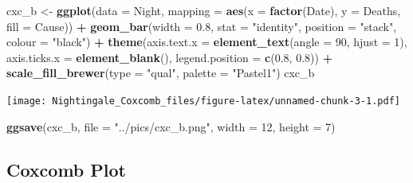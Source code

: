 \documentclass[
]{article}
\newenvironment{Shaded}{\begin{snugshade}}{\end{snugshade}}
\newcommand{\DataTypeTok}[1]{\textcolor[rgb]{0.13,0.29,0.53}{#1}}
\newcommand{\DecValTok}[1]{\textcolor[rgb]{0.00,0.00,0.81}{#1}}
\newcommand{\FloatTok}[1]{\textcolor[rgb]{0.00,0.00,0.81}{#1}}
\newcommand{\KeywordTok}[1]{\textcolor[rgb]{0.13,0.29,0.53}{\textbf{#1}}}
\newcommand{\NormalTok}[1]{#1}
\newcommand{\OperatorTok}[1]{\textcolor[rgb]{0.81,0.36,0.00}{\textbf{#1}}}
\newcommand{\StringTok}[1]{\textcolor[rgb]{0.31,0.60,0.02}{#1}}
\begin{document}
\begin{Shaded}
\begin{Highlighting}[]
\NormalTok{cxc_b <-}\StringTok{ }
\StringTok{  }\KeywordTok{ggplot}\NormalTok{(}\DataTypeTok{data =}\NormalTok{ Night,}
         \DataTypeTok{mapping =} \KeywordTok{aes}\NormalTok{(}\DataTypeTok{x =} \KeywordTok{factor}\NormalTok{(Date), }
                       \DataTypeTok{y =}\NormalTok{ Deaths, }
                       \DataTypeTok{fill =}\NormalTok{ Cause)) }\OperatorTok{+}
\StringTok{  }\KeywordTok{geom_bar}\NormalTok{(}\DataTypeTok{width =} \FloatTok{0.8}\NormalTok{, }
           \DataTypeTok{stat =} \StringTok{"identity"}\NormalTok{, }
           \DataTypeTok{position =} \StringTok{"stack"}\NormalTok{, }
           \DataTypeTok{colour =} \StringTok{"black"}\NormalTok{) }\OperatorTok{+}
\StringTok{  }\KeywordTok{theme}\NormalTok{(}\DataTypeTok{axis.text.x =} \KeywordTok{element_text}\NormalTok{(}\DataTypeTok{angle =} \DecValTok{90}\NormalTok{, }\DataTypeTok{hjust =} \DecValTok{1}\NormalTok{),}
        \DataTypeTok{axis.ticks.x =} \KeywordTok{element_blank}\NormalTok{(),}
        \DataTypeTok{legend.position =} \KeywordTok{c}\NormalTok{(}\FloatTok{0.8}\NormalTok{, }\FloatTok{0.8}\NormalTok{)) }\OperatorTok{+}
\StringTok{  }\KeywordTok{scale_fill_brewer}\NormalTok{(}\DataTypeTok{type =} \StringTok{"qual"}\NormalTok{, }
                    \DataTypeTok{palette =} \StringTok{"Pastel1"}\NormalTok{)}
\NormalTok{cxc_b}
\end{Highlighting}
\end{Shaded}

\texttt{[image: Nightingale\_Coxcomb\_files/figure-latex/unnamed-chunk-3-1.pdf]}

\begin{Shaded}
\begin{Highlighting}[]
\KeywordTok{ggsave}\NormalTok{(cxc_b, }\DataTypeTok{file =} \StringTok{"../pics/cxc_b.png"}\NormalTok{, }\DataTypeTok{width =} \DecValTok{12}\NormalTok{, }\DataTypeTok{height =} \DecValTok{7}\NormalTok{)}
\end{Highlighting}
\end{Shaded}

\hypertarget{coxcomb-plot}{%
\subsection{Coxcomb Plot}\label{coxcomb-plot}}
\end{document}
